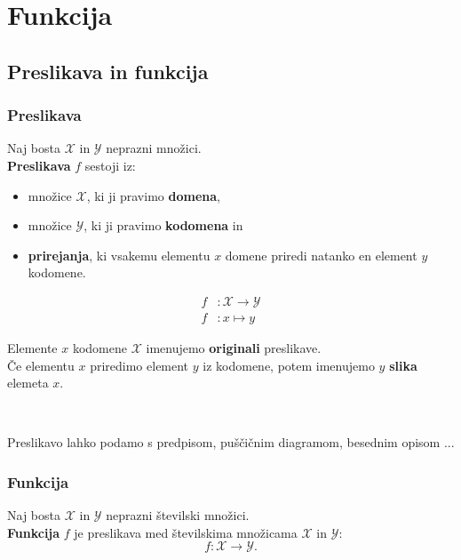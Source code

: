 \chapter{Funkcija}


\section{Preslikava in funkcija}

    \subsection*{Preslikava}

        Naj bosta $\mathcal{X}$ in $\mathcal{Y}$ neprazni množici. \\
        \textbf{Preslikava} $f$ sestoji iz:
        \begin{itemize}
            \item množice $\mathcal{X}$, ki ji pravimo \textbf{domena},
            \item množice $\mathcal{Y}$, ki ji pravimo \textbf{kodomena} in 
            \item \textbf{prirejanja}, ki vsakemu elementu $x$ domene priredi natanko en element $y$ kodomene.
        \end{itemize}

        $$\begin{aligned}
            f&: \mathcal{X}\to\mathcal{Y} \\ f&: x\mapsto y
        \end{aligned}  $$
    

        Elemente $x$ kodomene $\mathcal{X}$ imenujemo \textbf{originali} preslikave.
        \\ Če elementu $x$ priredimo element $y$ iz kodomene, potem imenujemo $y$ \textbf{slika} elemeta $x$.

        ~

        Preslikavo lahko podamo s predpisom, puščičnim diagramom, besednim opisom ...





    \subsection*{Funkcija}

        Naj bosta $\mathcal{X}$ in $\mathcal{Y}$ neprazni številski množici. \\
        \textbf{Funkcija} $f$ je preslikava med številskima množicama $\mathcal{X}$ in $\mathcal{Y}$:
        $$f: \mathcal{X}\to\mathcal{Y}.$$


